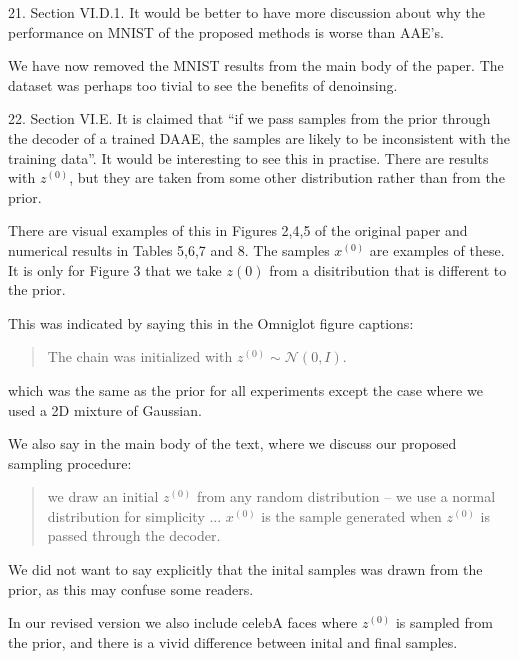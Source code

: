 \documentclass{article}
\begin{document}
{\color{blue}
21. Section VI.D.1. It would be better to have more discussion about why the performance on MNIST of the proposed methods is worse than AAE's.\\
}

{\color{red} We have now removed the MNIST results from the main body of the paper. The dataset was perhaps too tivial to see the benefits of denoinsing.\\}

{\color{blue}
22. Section VI.E. It is claimed that ``if we pass samples from the prior through the decoder of a trained DAAE, the samples are likely to be inconsistent with the training data''. It would be interesting to see this in practise. There are results with $z^{(0)}$, but they are taken from some other distribution rather than from the prior.\\
}

{\color{red}
There are visual examples of this in Figures 2,4,5 of the original paper and numerical results in Tables 5,6,7 and 8. The samples $x^{(0)}$ are examples of these. It is only for Figure 3 that we take $z{(0)}$ from a disitribution that is different to the prior.

This was indicated by saying this in the Omniglot figure captions:

\begin{quote}
The chain was initialized with $z^{(0)} \sim \mathcal{N}(0,I)$.
\end{quote}
which was the same as the prior for all experiments except the case where we used a 2D mixture of Gaussian.

We also say in the main body of the text, where we discuss our proposed sampling procedure:
\begin{quote}
we draw an initial $z^{(0)}$ from any random distribution – we use a normal distribution for simplicity ... $x^{(0)}$ is the sample generated when $z^{(0)}$ is passed through the decoder.
\end{quote}

We did not want to say explicitly that the inital samples was drawn from the prior, as this may confuse some readers.

In our revised version we also include celebA faces where $z^{(0)}$ is sampled from the prior, and there is a vivid difference between inital and final samples.\\


}
\end{document}
